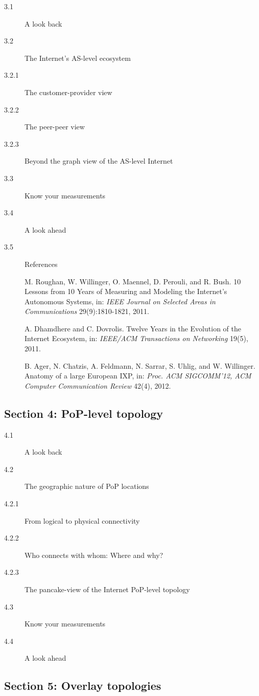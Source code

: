 \documentclass{sig-alternate-10pt}
\begin{document}
\begin{description}
\item[3.1] A look back
\item[3.2] The Internet's AS-level ecosystem
\item[3.2.1] The customer-provider view
\item[3.2.2] The peer-peer view
\item[3.2.3] Beyond the graph view of the AS-level Internet
\item[3.3] Know your measurements
\item[3.4] A look ahead
\item[3.5] References
\item[ ] M. Roughan, W. Willinger, O. Maennel, D. Perouli, and R. Bush. 10 Lessons from 10 Years of Measuring and Modeling the Internet's Autonomous Systems, in: {\em IEEE Journal on Selected Areas in Communications} 29(9):1810-1821, 2011.
\item[ ] A. Dhamdhere and C. Dovrolis. Twelve Years in the Evolution of the Internet Ecosystem, in: {\em IEEE/ACM Transactions on Networking} 19(5), 2011.
\item[ ] B. Ager, N. Chatzis, A. Feldmann, N. Sarrar, S. Uhlig, and W. Willinger. Anatomy of a large European IXP, in: {\em Proc. ACM SIGCOMM'12, ACM Computer Communication Review} 42(4), 2012.
\end{description}

\subsection*{Section 4: PoP-level topology}

\begin{description}
\item[4.1] A look back
\item[4.2] The geographic nature of PoP locations
\item[4.2.1] From logical to physical connectivity
\item[4.2.2] Who connects with whom: Where and why?
\item[4.2.3] The pancake-view of the Internet PoP-level topology
\item[4.3] Know your measurements
\item[4.4] A look ahead
\end{description}

\subsection*{Section 5: Overlay topologies}
\end{document}
